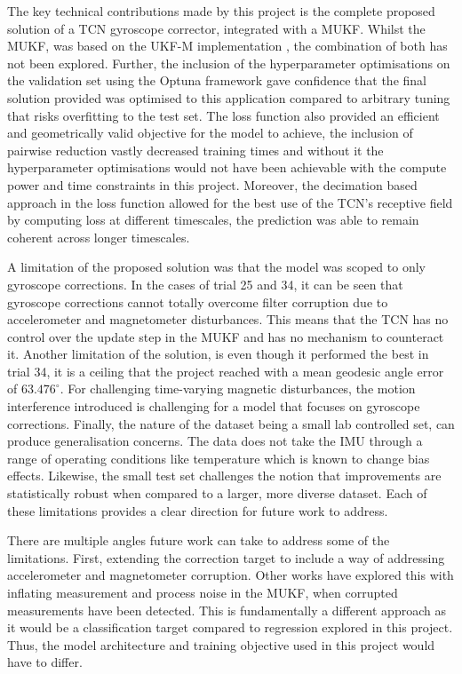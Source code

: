 The key technical contributions made by this project is the complete proposed solution of a TCN gyroscope corrector, integrated with a MUKF. Whilst the MUKF, was based on the UKF-M implementation \cite{brossard_2020_a},
the combination of both has not been explored. Further, the inclusion of the hyperparameter optimisations on the validation set 
using the Optuna framework gave confidence that the final solution provided was optimised to this application compared to arbitrary tuning that risks overfitting to the test set.
The loss function also provided an efficient and geometrically valid objective for the model to achieve, the inclusion of pairwise reduction vastly decreased training times and without it the hyperparameter
optimisations would not have been achievable with the compute power and time constraints in this project. Moreover, the decimation based approach in the loss function allowed for the best use of the TCN's 
receptive field by computing loss at different timescales, the prediction was able to remain coherent across longer timescales. 

A limitation of the proposed solution was that the model was scoped to only gyroscope corrections. In the cases of trial 25 and 34, it can be seen that gyroscope corrections cannot totally 
overcome filter corruption due to accelerometer and magnetometer disturbances. This means that the TCN has no control over the update step in the MUKF and has no mechanism to counteract it.
Another limitation of the solution, is even though it performed the best in trial 34, it is a ceiling that the project reached with a mean geodesic angle error of $63.476^{\circ}$. For
challenging time-varying magnetic disturbances, the motion interference introduced is challenging for a model that focuses on gyroscope corrections. 
Finally, the nature of the dataset being a small lab controlled set, can 
produce generalisation concerns. The data does not take the IMU through a range of operating conditions like temperature which is known to change bias effects. Likewise, the small test set 
challenges the notion that improvements are statistically  robust when compared to a larger, more diverse dataset. Each of these limitations provides a clear direction for 
future work to address.

There are multiple angles future work can take to address some of the limitations. First, extending the correction target to include a way of addressing accelerometer and magnetometer corruption. 
Other works have explored this with inflating measurement and process noise in the MUKF, when corrupted measurements have been detected. This is fundamentally a different approach as it would be 
a classification target compared to regression explored in this project. Thus, the model architecture and training objective used in this project would have to differ. 

